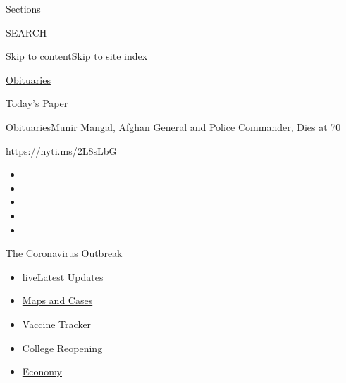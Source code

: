 Sections

SEARCH

\protect\hyperlink{site-content}{Skip to
content}\protect\hyperlink{site-index}{Skip to site index}

\href{https://www.nytimes.com/section/obituaries}{Obituaries}

\href{https://myaccount.nytimes.com/auth/login?response_type=cookie\&client_id=vi}{}

\href{https://www.nytimes.com/section/todayspaper}{Today's Paper}

\href{/section/obituaries}{Obituaries}\textbar{}Munir Mangal, Afghan
General and Police Commander, Dies at 70

\url{https://nyti.ms/2L8sLbG}

\begin{itemize}
\item
\item
\item
\item
\item
\end{itemize}

\href{https://www.nytimes.com/news-event/coronavirus?action=click\&pgtype=Article\&state=default\&region=TOP_BANNER\&context=storylines_menu}{The
Coronavirus Outbreak}

\begin{itemize}
\tightlist
\item
  live\href{https://www.nytimes.com/2020/08/03/world/coronavirus-covid-19.html?action=click\&pgtype=Article\&state=default\&region=TOP_BANNER\&context=storylines_menu}{Latest
  Updates}
\item
  \href{https://www.nytimes.com/interactive/2020/us/coronavirus-us-cases.html?action=click\&pgtype=Article\&state=default\&region=TOP_BANNER\&context=storylines_menu}{Maps
  and Cases}
\item
  \href{https://www.nytimes.com/interactive/2020/science/coronavirus-vaccine-tracker.html?action=click\&pgtype=Article\&state=default\&region=TOP_BANNER\&context=storylines_menu}{Vaccine
  Tracker}
\item
  \href{https://www.nytimes.com/2020/08/02/us/covid-college-reopening.html?action=click\&pgtype=Article\&state=default\&region=TOP_BANNER\&context=storylines_menu}{College
  Reopening}
\item
  \href{https://www.nytimes.com/live/2020/08/03/business/stock-market-today-coronavirus?action=click\&pgtype=Article\&state=default\&region=TOP_BANNER\&context=storylines_menu}{Economy}
\end{itemize}

